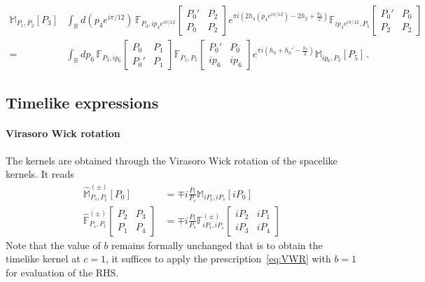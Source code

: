 \documentclass[11pt]{article}
\begin{document}
\begin{equation}
    \begin{aligned}
        \mathbb{M}_{P_1,P_2}[P_3]&\int_{\mathbb{R}} d(p_4e^{i\pi /12}) \, \mathbb{F}_{P_3, i p_4 e^{i\pi /12}}\begin{bmatrix}
            P_0' & P_2 \\
            P_0 & P_2
        \end{bmatrix}
        e^{\pi i (2h_4(p_4e^{i\pi /12})-2h_2+\frac{h_3}{2})}\mathbb{F}_{ip_4 e^{i\pi /12}, P_5} \begin{bmatrix}
            P_0' & P_0 \\
            P_2 & P_2
        \end{bmatrix}\\
        =& \int_{\mathbb{R}} dp_6 \, \mathbb{F}_{P_3, ip_6}\begin{bmatrix}
            P_0 & P_1 \\
            P_0' & P_1
        \end{bmatrix}
        \mathbb{F}_{P_1,P_5}\begin{bmatrix}
            P_0' & P_0 \\
            ip_6 & ip_6
        \end{bmatrix}
        e^{\pi i (h_0+h_0'-\frac{h_5}{2})}\mathbb{M}_{ip_6,P_2}[P_5]\,.
    \end{aligned}
\end{equation}

\subsection{Timelike expressions}

\paragraph{Virasoro Wick rotation}
The kernels are obtained through the Virasoro Wick rotation of the spacelike kernels. It reads
\begin{equation}\label{eq:VWR}
    \begin{aligned}
        \hat{\mathbb{M}}_{P_s,P_t}^{(\pm)}[P_0] &= \mp i \frac{P_t}{P_s}\mathbb{M}_{iP_t,iP_s}[iP_0] \\
        \hat{\mathbb{F}}_{P_s,P_t}^{(\pm)}\begin{bmatrix}
     P_2 & P_3 \\
     P_1 & P_4
    \end{bmatrix} &= \mp i \frac{P_t}{P_s} \mathbb{F}_{iP_t,iP_s}^{(\pm)}\begin{bmatrix}
     iP_2 & iP_1 \\
     iP_3 & iP_4
    \end{bmatrix}
    \end{aligned}
\end{equation}
Note that the value of $b$ remains formally unchanged that is to obtain the timelike kernel at $c=1$, it suffices to apply the prescription~\eqref{eq:VWR} with $b=1$ for evaluation of the RHS.
\end{document}
